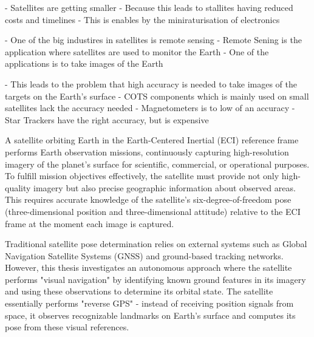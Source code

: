 \label{chap:introduction}

\label{sec:overview}

- Satellites are getting smaller
- Because this leads to stallites having reduced costs and timelines
- This is enables by the miniraturisation of electronics

- One of the big industires in satellites is remote sensing
- Remote Sening is the application where satellites are used to monitor the Earth
- One of the applications is to take images of the Earth

- This leads to the problem that high accuracy is needed to take images of the targets on the Earth's surface
- COTS components which is mainly used on small satellites lack the accuracy needed
- Magnetometers is to low of an accuracy
- Star Trackers have the right accuracy, but is expensive

\label{sec:moddef}

A satellite orbiting Earth in the Earth-Centered Inertial (ECI) reference frame performs Earth observation missions, 
continuously capturing high-resolution imagery of the planet's surface for scientific, commercial, or operational purposes. 
To fulfill mission objectives effectively, the satellite must provide not only high-quality imagery but also precise geographic 
information about observed areas. This requires accurate knowledge of the satellite's six-degree-of-freedom pose 
(three-dimensional position and three-dimensional attitude) relative to the ECI frame at the moment each image is captured.
\vspace{0.5cm}

\noindent Traditional satellite pose determination relies on external systems such as Global Navigation Satellite Systems (GNSS) 
and ground-based tracking networks. However, this thesis investigates an autonomous approach where the satellite performs 
"visual navigation" by identifying known ground features in its imagery and using these observations to determine its orbital 
state. The satellite essentially performs "reverse GPS" - instead of receiving position signals from space, it observes 
recognizable landmarks on Earth's surface and computes its pose from these visual references.
\vspace{0.5cm}

